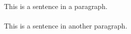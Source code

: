 \documentclass{article}
\begin{document}
\noindent
\paragraph{}
This is a sentence in a paragraph.
\paragraph{}
This is a sentence in another paragraph.
\end{document}
